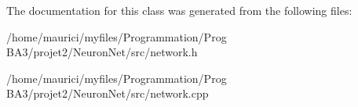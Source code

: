 The documentation for this class was generated from the following files\+:\begin{DoxyCompactItemize}
\item 
/home/maurici/myfiles/\+Programmation/\+Prog B\+A3/projet2/\+Neuron\+Net/src/network.\+h\item 
/home/maurici/myfiles/\+Programmation/\+Prog B\+A3/projet2/\+Neuron\+Net/src/network.\+cpp\end{DoxyCompactItemize}
